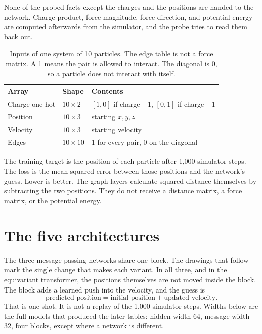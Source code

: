 \documentclass[11pt]{article}
\begin{document}
None of the probed facts except the charges and the positions are handed to the network.
Charge product, force magnitude, force direction, and potential energy are computed afterwards from the simulator, and the probe tries to read them back out.

\begin{table}[ht]
\centering
\caption{Inputs of one system of 10 particles.
The edge table is not a force matrix.
A 1 means the pair is allowed to interact.
The diagonal is 0, so a particle does not interact with itself.}
\label{tab:inputs}
\begin{tabular}{lll}
\toprule
Array & Shape & Contents \\
\midrule
Charge one-hot & $10 \times 2$ & $[1,0]$ if charge $-1$, $[0,1]$ if charge $+1$ \\
Position & $10 \times 3$ & starting $x,y,z$ \\
Velocity & $10 \times 3$ & starting velocity \\
Edges & $10 \times 10$ & 1 for every pair, 0 on the diagonal \\
\bottomrule
\end{tabular}
\end{table}

The training target is the position of each particle after 1{,}000 simulator steps.
The loss is the mean squared error between those positions and the network's guess.
Lower is better.
The graph layers calculate squared distance themselves by subtracting the two positions.
They do not receive a distance matrix, a force matrix, or the potential energy.

\section{The five architectures}

The three message-passing networks share one block.
The drawings that follow mark the single change that makes each variant.
In all three, and in the equivariant transformer, the positions themselves are not moved inside the block.
The block adds a learned push into the velocity, and the guess is
\[
\text{predicted position} = \text{initial position} + \text{updated velocity}.
\]
That is one shot.
It is not a replay of the 1{,}000 simulator steps.
Widths below are the full models that produced the later tables: hidden width 64, message width 32, four blocks, except where a network is different.
\end{document}
